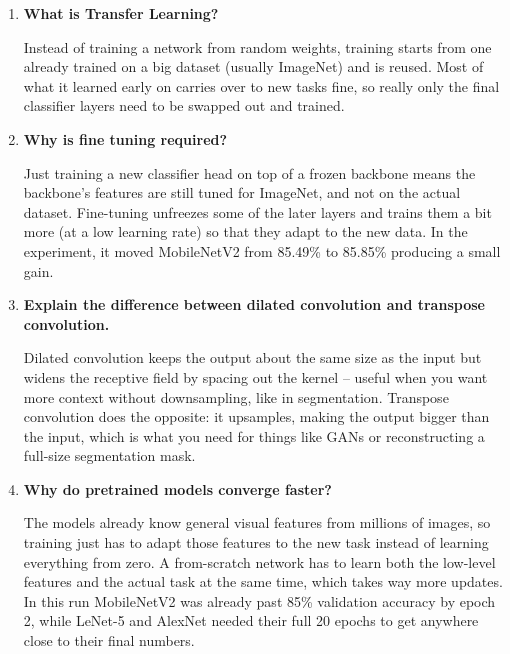 \documentclass[11pt]{article}
\begin{document}
\begin{enumerate}
LeNet-5 is small with 7 layers and just 60K parameters, built for small grayscale
digit images. On the other hand, ResNet50 is 50 layers and 25.6M parameters, built for
large-scale color images, and only works because of skip connections. In the experiment, LeNet-5 got 50.65\% from scratch,
ResNet50 got 84.81\% with transfer learning where both the extra depth and the
pretrained features contribute to the higher accuracy.

\item \textbf{What is Transfer Learning?}

Instead of training a network from random weights, training starts from one
already trained on a big dataset (usually ImageNet) and is reused. Most of
what it learned early on carries over to
new tasks fine, so really only the final classifier layers need to be
swapped out and trained.

\item \textbf{Why is fine tuning required?}

Just training a new classifier head on top of a frozen backbone means the
backbone's features are still tuned for ImageNet, and not on the actual dataset.
Fine-tuning unfreezes some of the later layers and trains them a bit more
(at a low learning rate) so that they adapt to the new data. In the experiment, it moved
MobileNetV2 from 85.49\% to 85.85\% producing a small gain.

\item \textbf{Explain the difference between dilated convolution and transpose convolution.}

Dilated convolution keeps the output about the same size as the input but
widens the receptive field by spacing out the kernel -- useful when you want
more context without downsampling, like in segmentation. Transpose
convolution does the opposite: it upsamples, making the output bigger than
the input, which is what you need for things like GANs or reconstructing a
full-size segmentation mask.

\item \textbf{Why do pretrained models converge faster?}

The models already know general visual features from millions of images, so
training just has to adapt those features to the new task instead of
learning everything from zero. A from-scratch network has to learn both the
low-level features and the actual task at the same time, which takes way
more updates. In this run MobileNetV2 was already past 85\% validation
accuracy by epoch 2, while LeNet-5 and AlexNet needed their full 20 epochs
to get anywhere close to their final numbers.


\end{enumerate}
\end{document}
